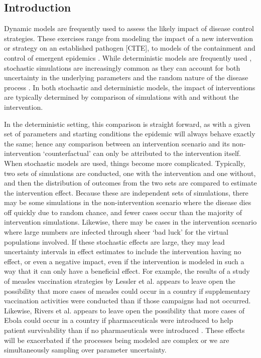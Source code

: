 \documentclass[PTRSB]{rsos}
\begin{document}
\begin{multicols}{2}
\section{Introduction}
Dynamic models are frequently used to assess the likely impact of disease control strategies.
These exercises range from modeling the impact of a new intervention or strategy on an established pathogen [CITE], to models of the containment and control of emergent epidemics \cite{lessler-et-al:2016}.
While deterministic models are frequently used \cite{fraser-et-al:2004}, stochastic simulations are increasingly common as they can account for both uncertainty in the underlying parameters and the random nature of the disease process \cite{ferguson-et-al:2003}.
In both stochastic and deterministic models, the impact of interventions are typically determined by comparison of simulations with and without the intervention.

In the deterministic setting, this comparison is straight forward, as with a given set of parameters and starting conditions the epidemic will always behave exactly the same; hence any comparison between an intervention scenario and its non-intervention ‘counterfactual’ can only be attributed to the intervention itself.
When stochastic models are used, things become more complicated.
Typically, two sets of simulations are conducted, one with the intervention and one without, and then the distribution of outcomes from the two sets are compared to estimate the intervention effect.
Because these are independent sets of simulations, there may be some simulations in the non-intervention scenario where the disease dies off quickly due to random chance, and fewer cases occur than the majority of intervention simulations.
Likewise, there may be cases in the intervention scenario where large numbers are infected through sheer ‘bad luck’ for the virtual populations involved.
If these stochastic effects are large, they may lead uncertainty intervals in effect estimates to include the intervention having no effect, or even a negative impact, even if the intervention is modeled in such a way that it can only have a beneficial effect.
For example, the results of a study of measles vaccination strategies by Lessler et al. appears to leave open the possibility that more cases of measles could occur in a country if supplementary vaccination activities were conducted than if those campaigns had not occurred.
Likewise, Rivers et al. appears to leave open the possibility that more cases of Ebola could occur in a country if pharmaceuticals were introduced to help patient survivability than if no pharmaeuticals were introduced \cite{rivers-et-al:2014}.
These effects will be exacerbated if the processes being modeled are complex or we are simultaneously sampling over parameter uncertainty.


\end{multicols}
\end{document}

